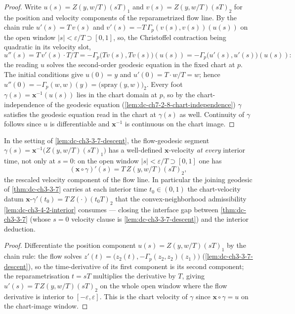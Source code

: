 \begin{proof}
  \sketch
  \leanok
  Write $u(s)=Z(y,w/T)(sT)_1$ and $v(s)=Z(y,w/T)(sT)_2$ for the position and
  velocity components of the reparametrized flow line. By the chain rule
  $u'(s)=T\,v(s)$ and $v'(s)=-T\,\Gamma_p(v(s),v(s))(u(s))$ on the open window
  $|s|<\varepsilon/T\supset[0,1]$, so, the Christoffel contraction being
  quadratic in its velocity slot,
  $$
  u''(s)=T\,v'(s)\cdot T/T=-\Gamma_p\bigl(T v(s),T v(s)\bigr)(u(s))
    =-\Gamma_p\bigl(u'(s),u'(s)\bigr)(u(s)):
  $$
  the reading $u$ solves the second-order geodesic equation in the fixed chart
  at $p$. The initial conditions give $u(0)=y$ and $u'(0)=T\cdot w/T=w$; hence
  $u''(0)=-\Gamma_p(w,w)(y)=\bigl(\mathrm{spray}(y,w)\bigr)_2$. Every
  foot $\gamma(s)=\mathbf{x}^{-1}(u(s))$ lies in the chart domain at $p$, so by
  the chart-independence of the geodesic equation
  (\cref{lem:dc-ch7-2-8-chart-independence}) $\gamma$ satisfies the geodesic
  equation read in the chart at $\gamma(s)$ as well. Continuity of $\gamma$
  follows since $u$ is differentiable and $\mathbf{x}^{-1}$ is continuous on the
  chart image.
\end{proof}

\begin{lemma}
  \label{lem:dc-ch3-3-7-descent-velocity}
  \leanok
  In the setting of \cref{lem:dc-ch3-3-7-descent}, the flow-geodesic segment
  $\gamma(s)=\mathbf{x}^{-1}\bigl(Z(y,w/T)(sT)_1\bigr)$ has a well-defined
  $\mathbf{x}$-velocity \emph{at every} interior time, not only at $s=0$: on the
  open window $|s|<\varepsilon/T\supset[0,1]$ one has
  $$
  (\mathbf{x}\circ\gamma)'(s)=T\,Z(y,w/T)(sT)_2,
  $$
  the rescaled velocity component of the flow line. In particular the joining
  geodesic of \cref{thm:dc-ch3-3-7} carries at each interior time $t_0\in(0,1)$ the
  chart-velocity datum $\mathbf{x}$-$\gamma'(t_0)=T\,Z(\cdot)(t_0T)_2$ that the
  convex-neighborhood admissibility \cref{lem:dc-ch3-4-2-interior} consumes —
  closing the interface gap between \cref{thm:dc-ch3-3-7} (whose $s=0$ velocity
  clause is \cref{lem:dc-ch3-3-7-descent}) and the interior deduction.
\end{lemma}
\begin{proof}
  \sketch
  \leanok
  Differentiate the position component $u(s)=Z(y,w/T)(sT)_1$ by the chain rule:
  the flow solves $z'(t)=\bigl(z_2(t),-\Gamma_p(z_2,z_2)(z_1)\bigr)$
  (\cref{lem:dc-ch3-3-7-descent}), so the time-derivative of its first component
  is its second component; the reparametrisation $t=sT$ multiplies the derivative
  by $T$, giving $u'(s)=T\,Z(y,w/T)(sT)_2$ on the whole open window where the flow
  derivative is interior to $[-\varepsilon,\varepsilon]$. This is the chart velocity
  of $\gamma$ since $\mathbf{x}\circ\gamma=u$ on the chart-image window.
\end{proof}

